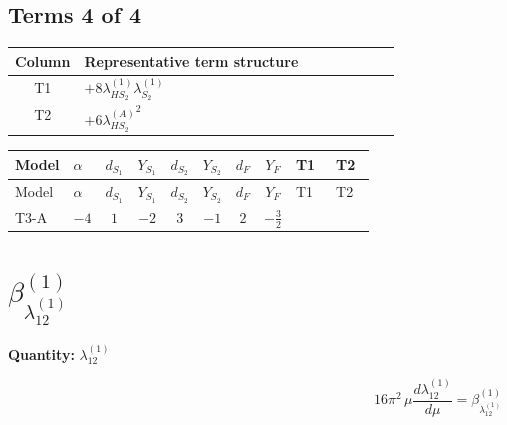 \documentclass[8pt]{article}
\begin{document}
\begin{landscape}
\subsection*{Terms 4 of 4}
\begin{center}
\begin{tabular}{@{}c >{\raggedright\arraybackslash}p{0.82\linewidth}@{}}
\toprule
Column & Representative term structure \\
\midrule
T1 & \(\displaystyle +8 {\lambda_{HS_2}^{(1)}} {\lambda_{S_2}^{(1)}}\) \\
\midrule
T2 & \(\displaystyle +6 {\lambda_{HS_2}^{(A)}}^2\) \\
\midrule
\bottomrule
\end{tabular}
\end{center}
\smallskip
\tiny
\begin{longtable}{@{}llcccccc >{\raggedright\arraybackslash}p{0.21\linewidth} >{\raggedright\arraybackslash}p{0.21\linewidth}@{}}
\toprule
Model & $\alpha$ & $d_{S_1}$ & $Y_{S_1}$ & $d_{S_2}$ & $Y_{S_2}$ & $d_F$ & $Y_F$ & T1 & T2 \\
\midrule
\endfirsthead
\toprule
Model & $\alpha$ & $d_{S_1}$ & $Y_{S_1}$ & $d_{S_2}$ & $Y_{S_2}$ & $d_F$ & $Y_F$ & T1 & T2 \\
\midrule
\endhead
T3-A & $-4$ & $1$ & $-2$ & $3$ & $-1$ & $2$ & $-\frac{3}{2}$ & \scriptsize\adjustbox{max width=\linewidth}{$\begin{gathered} +8 {\lambda_{HS_2}^{(1)}} {\lambda_{S_2}^{(1)}}\end{gathered}$} & \scriptsize\adjustbox{max width=\linewidth}{$\begin{gathered} +6 {\lambda_{HS_2}^{(A)}}^2\end{gathered}$} \\
\midrule
\bottomrule
\end{longtable}
\clearpage
\section*{$\beta_{\lambda_{12}^{(1)}}^{(1)}$}
\noindent\textbf{Quantity: }$\lambda_{12}^{(1)}$\par\smallskip
\[16\pi^2\,\mu\frac{d \lambda_{12}^{(1)}}{d\mu}=\beta_{\lambda_{12}^{(1)}}^{(1)}\]

\end{landscape}
\end{document}
